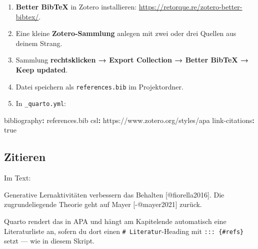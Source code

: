 \documentclass[
  ngerman,
  a4paper,
  DIV=11]{scrreprt}
\newenvironment{Shaded}{\begin{snugshade}}{\end{snugshade}}
\newcommand{\AttributeTok}[1]{\textcolor[rgb]{0.40,0.45,0.13}{#1}}
\newcommand{\CharTok}[1]{\textcolor[rgb]{0.13,0.47,0.30}{#1}}
\newcommand{\CommentTok}[1]{\textcolor[rgb]{0.37,0.37,0.37}{#1}}
\newcommand{\FunctionTok}[1]{\textcolor[rgb]{0.28,0.35,0.67}{#1}}
\newcommand{\KeywordTok}[1]{\textcolor[rgb]{0.00,0.23,0.31}{\textbf{#1}}}
\newcommand{\NormalTok}[1]{\textcolor[rgb]{0.00,0.23,0.31}{#1}}
\newcommand{\OtherTok}[1]{\textcolor[rgb]{0.00,0.23,0.31}{#1}}
\providecommand{\tightlist}{%
  \setlength{\itemsep}{0pt}\setlength{\parskip}{0pt}}
\begin{document}
\begin{enumerate}
\def\labelenumi{\arabic{enumi}.}
\tightlist
\item
  \textbf{Better BibTeX} in Zotero installieren:
  \url{https://retorque.re/zotero-better-bibtex/}.
\item
  Eine kleine \textbf{Zotero-Sammlung} anlegen mit zwei oder drei
  Quellen aus deinem Strang.
\item
  Sammlung \textbf{rechtsklicken → Export Collection → Better BibTeX →
  Keep updated}.
\item
  Datei speichern als \texttt{references.bib} im Projektordner.
\item
  In \texttt{\_quarto.yml}:
\end{enumerate}

\begin{Shaded}
\begin{Highlighting}[]
\FunctionTok{bibliography}\KeywordTok{:}\AttributeTok{ references.bib}
\FunctionTok{csl}\KeywordTok{:}\AttributeTok{ https://www.zotero.org/styles/apa}
\FunctionTok{link{-}citations}\KeywordTok{:}\AttributeTok{ }\CharTok{true}
\end{Highlighting}
\end{Shaded}

\subsection{Zitieren}\label{zitieren}

Im Text:

\begin{Shaded}
\begin{Highlighting}[]
\NormalTok{Generative Lernaktivitäten verbessern das Behalten }\CommentTok{[}\OtherTok{@fiorella2016}\CommentTok{]}\NormalTok{.}
\NormalTok{Die zugrundeliegende Theorie geht auf Mayer }\CommentTok{[}\OtherTok{{-}@mayer2021}\CommentTok{]}\NormalTok{ zurück.}
\end{Highlighting}
\end{Shaded}

Quarto rendert das in APA und hängt am Kapitelende automatisch eine
Literaturliste an, sofern du dort einen \texttt{\#\ Literatur}-Heading
mit \texttt{:::\ \{\#refs\}} setzt --- wie in diesem Skript.
\end{document}
